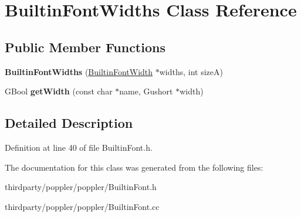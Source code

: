 \hypertarget{class_builtin_font_widths}{}\section{Builtin\+Font\+Widths Class Reference}
\label{class_builtin_font_widths}
\subsection*{Public Member Functions}
\begin{DoxyCompactItemize}
\item 
\mbox{\label{class_builtin_font_widths_a73ea217695d08888ca4530b76c5f2606}} 
{\bfseries Builtin\+Font\+Widths} (\hyperlink{struct_builtin_font_width}{Builtin\+Font\+Width} $\ast$widths, int sizeA)
\item 
\mbox{\label{class_builtin_font_widths_a8f906a6d70e2a2bd2128d983b92a0b58}} 
G\+Bool {\bfseries get\+Width} (const char $\ast$name, Gushort $\ast$width)
\end{DoxyCompactItemize}


\subsection{Detailed Description}


Definition at line 40 of file Builtin\+Font.\+h.



The documentation for this class was generated from the following files\+:\begin{DoxyCompactItemize}
\item 
thirdparty/poppler/poppler/Builtin\+Font.\+h\item 
thirdparty/poppler/poppler/Builtin\+Font.\+cc\end{DoxyCompactItemize}
